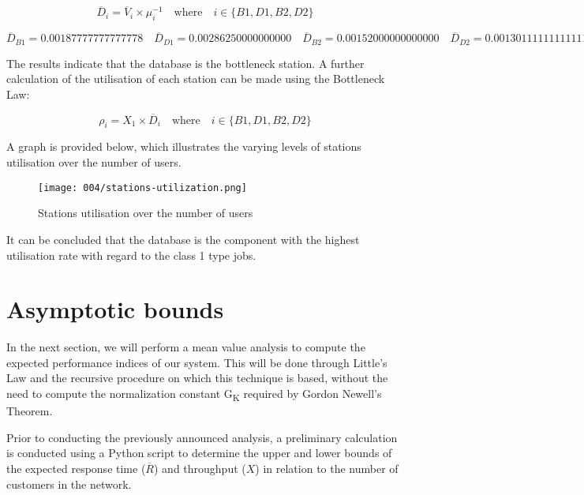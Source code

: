 \begin{equation}
	\label{eq:service-demands}
	\overline{D}_i = \overline{V}_i \times \mu^{-1}_i \quad \text{where} \quad i \in \{B1, D1, B2, D2\}
\end{equation}

\[
\overline{D}_{B1} = \num[round-mode=places, round-precision=5]{0.00187777777777778}
\quad
\overline{D}_{D1} = \num[round-mode=places, round-precision=5]{0.00286250000000000}
\quad
\overline{D}_{B2} = \num[round-mode=places, round-precision=5]{0.00152000000000000}
\quad
\overline{D}_{D2} = \num[round-mode=places, round-precision=5]{0.00130111111111111}
\]

The results indicate that the database is the bottleneck station. 
A further calculation of the utilisation of each station can be made using the Bottleneck Law:

\begin{equation}
	\label{eq:bottleneck-law}
	\rho_i = X_1 \times \overline{D}_i \quad \text{where} \quad i \in \{B1, D1, B2, D2\}
\end{equation}

A graph is provided below, which illustrates the varying levels of stations utilisation over the number of users.

\begin{figure}[h]
	\centering
	\texttt{[image: 004/stations-utilization.png]}
	\caption{Stations utilisation over the number of users}
\end{figure}

It can be concluded that the database is the component with the highest utilisation rate with regard to the class 1 type jobs.

\section{Asymptotic bounds}

In the next section, we will perform a mean value analysis to compute the expected performance indices of our system.
This will be done through Little's Law and the recursive procedure on which this technique is based, without the need to compute the normalization constant G\textsubscript{K} required by Gordon Newell's Theorem.

Prior to conducting the previously announced analysis, a preliminary calculation is conducted using a Python script to determine the upper and lower bounds of the expected response time ($\overline{R}$) and throughput ($X$) in relation to the number of customers in the network.

